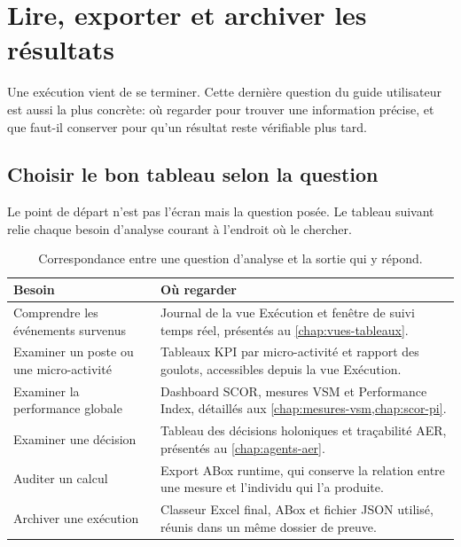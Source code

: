 \chapter{Lire, exporter et archiver les résultats}
\label{chap:resultats-exports}

Une exécution vient de se terminer. Cette dernière question du guide utilisateur est aussi la plus concrète: où regarder pour trouver une information précise, et que faut-il conserver pour qu'un résultat reste vérifiable plus tard.

\section{Choisir le bon tableau selon la question}

Le point de départ n'est pas l'écran mais la question posée. Le tableau suivant relie chaque besoin d'analyse courant à l'endroit où le chercher.

\begin{table}[H]
  \centering
  \begin{tabularx}{\textwidth}{L{0.28\textwidth} Y}
    \toprule
    Besoin & Où regarder \\
    \midrule
    Comprendre les événements survenus & Journal de la vue Exécution et fenêtre de suivi temps réel, présentés au \cref{chap:vues-tableaux}. \\
    Examiner un poste ou une micro-activité & Tableaux KPI par micro-activité et rapport des goulots, accessibles depuis la vue Exécution. \\
    Examiner la performance globale & Dashboard SCOR, mesures VSM et Performance Index, détaillés aux \cref{chap:mesures-vsm,chap:scor-pi}. \\
    Examiner une décision & Tableau des décisions holoniques et traçabilité AER, présentés au \cref{chap:agents-aer}. \\
    Auditer un calcul & Export ABox runtime, qui conserve la relation entre une mesure et l'individu qui l'a produite. \\
    Archiver une exécution & Classeur Excel final, ABox et fichier JSON utilisé, réunis dans un même dossier de preuve. \\
    \bottomrule
  \end{tabularx}
  \caption{Correspondance entre une question d'analyse et la sortie qui y répond.}
  \label{tab:besoin-vers-sortie}
\end{table}


